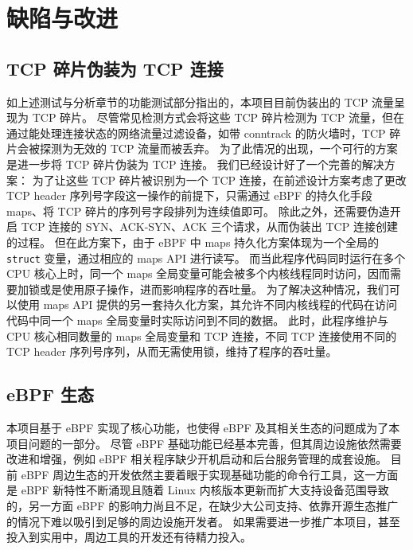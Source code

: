 

\chapter{缺陷与改进}

\section{TCP 碎片伪装为 TCP 连接}

如上述测试与分析章节的功能测试部分指出的，本项目目前伪装出的 TCP 流量呈现为 TCP 碎片。
尽管常见检测方式会将这些 TCP 碎片检测为 TCP 流量，但在通过能处理连接状态的网络流量过滤设备，如带 conntrack 的防火墙时，TCP 碎片会被探测为无效的 TCP 流量而被丢弃。
为了此情况的出现，一个可行的方案是进一步将 TCP 碎片伪装为 TCP 连接。
我们已经设计好了一个完善的解决方案：
为了让这些 TCP 碎片被识别为一个 TCP 连接，在前述设计方案考虑了更改 TCP header 序列号字段这一操作的前提下，只需通过 eBPF 的持久化手段 maps、将 TCP 碎片的序列号字段排列为连续值即可。
除此之外，还需要伪造开启 TCP 连接的 SYN、ACK-SYN、ACK 三个请求，从而伪装出 TCP 连接创建的过程。
但在此方案下，由于 eBPF 中 maps 持久化方案体现为一个全局的 \texttt{struct} 变量，通过相应的 maps API 进行读写。
而当此程序代码同时运行在多个 CPU 核心上时，同一个 maps 全局变量可能会被多个内核线程同时访问，因而需要加锁或是使用原子操作，进而影响程序的吞吐量。
为了解决这种情况，我们可以使用 maps API 提供的另一套持久化方案，其允许不同内核线程的代码在访问代码中同一个 maps 全局变量时实际访问到不同的数据。
此时，此程序维护与 CPU 核心相同数量的 maps 全局变量和 TCP 连接，不同 TCP 连接使用不同的 TCP header 序列号序列，从而无需使用锁，维持了程序的吞吐量。

\section{eBPF 生态}

本项目基于 eBPF 实现了核心功能，也使得 eBPF 及其相关生态的问题成为了本项目问题的一部分。
尽管 eBPF 基础功能已经基本完善，但其周边设施依然需要改进和增强，例如 eBPF 相关程序缺少开机启动和后台服务管理的成套设施。
目前 eBPF 周边生态的开发依然主要着眼于实现基础功能的命令行工具，这一方面是 eBPF 新特性不断涌现且随着 Linux 内核版本更新而扩大支持设备范围导致的，另一方面 eBPF 的影响力尚且不足，在缺少大公司支持、依靠开源生态推广的情况下难以吸引到足够的周边设施开发者。
如果需要进一步推广本项目，甚至投入到实用中，周边工具的开发还有待精力投入。
